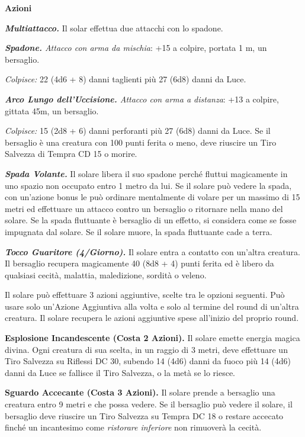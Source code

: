 \begin{multicols}{2}
\textbf{Azioni}

\emph{\textbf{Multiattacco.}} Il solar effettua due attacchi con lo spadone.

\emph{\textbf{Spadone.} Attacco con arma da mischia}: +15 a colpire, portata 1 m, un bersaglio.

\emph{Colpisce:} 22 (4d6 + 8) danni taglienti più 27 (6d8) danni da Luce.

\emph{\textbf{Arco Lungo dell'Uccisione.} Attacco con arma a distanza}: +13 a colpire, gittata 45m, un bersaglio.

\emph{Colpisce:} 15 (2d8 + 6) danni perforanti più 27 (6d8) danni da Luce. Se il bersaglio è una creatura con 100 punti ferita o meno, deve riuscire un Tiro Salvezza di Tempra CD 15 o morire.

\emph{\textbf{Spada Volante.}} Il solare libera il suo spadone perché fluttui magicamente in uno spazio non occupato entro 1 metro da lui.  Se il solare può vedere la spada, con un'azione bonus le può ordinare mentalmente di volare per un massimo di 15 metri ed effettuare un attacco contro un bersaglio o ritornare nella mano del solare. Se la spada fluttuante è bersaglio di un effetto, si considera come se fosse impugnata dal solare. Se il solare muore, la spada fluttuante cade a terra.

\emph{\textbf{Tocco Guaritore (4/Giorno).}} Il solare entra a contatto con un'altra creatura. Il bersaglio recupera magicamente 40 (8d8 + 4) punti ferita ed è libero da qualsiasi cecità, malattia, maledizione, sordità o veleno.

Il solare può effettuare 3 azioni aggiuntive, scelte tra le opzioni seguenti. Può usare solo un'Azione Aggiuntiva alla volta e solo al termine del round di un'altra creatura. Il solare recupera le azioni aggiuntive spese all'inizio del proprio round. 

\textbf{Esplosione Incandescente (Costa 2 Azioni).} Il solare emette energia magica divina. Ogni creatura di sua scelta, in un raggio di 3 metri, deve effettuare un Tiro Salvezza su Riflessi DC  30, subendo 14 (4d6) danni da fuoco più 14 (4d6) danni da Luce se fallisce il Tiro Salvezza, o la metà se lo riesce. 

\textbf{Sguardo Accecante (Costa 3 Azioni).} Il solare prende a bersaglio una creatura entro 9 metri e che possa vedere. Se il bersaglio può vedere il solare, il bersaglio deve riuscire un Tiro Salvezza su Tempra DC  18 o restare accecato finché un incantesimo come \emph{ristorare inferiore} non rimuoverà la cecità.


\end{multicols}
